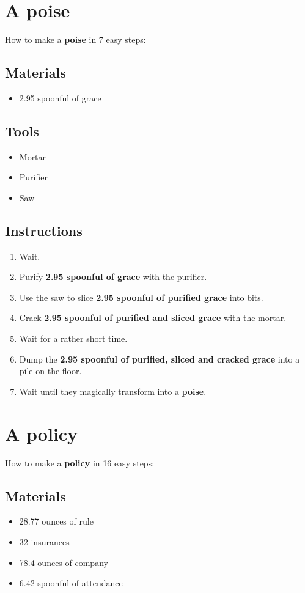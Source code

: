 \documentclass{article}
\begin{document}
\section{A poise}How to make a \textbf{poise} in 7 easy steps:

\subsection{Materials}\begin{itemize}
\item 
2.95 spoonful of grace
\end{itemize}
\subsection{Tools}\begin{itemize}
\item 
Mortar
\item 
Purifier
\item 
Saw
\end{itemize}
\subsection{Instructions}\begin{enumerate}
\item 
Wait.
\item 
Purify \textbf{2.95 spoonful of grace} with the purifier.
\item 
Use the saw to slice \textbf{2.95 spoonful of purified grace} into bits.
\item 
Crack \textbf{2.95 spoonful of purified and sliced grace} with the mortar.
\item 
Wait for a rather short time.
\item 
Dump the \textbf{2.95 spoonful of purified, sliced and cracked grace} into a pile on the floor.
\item 
Wait until they magically transform into a \textbf{poise}.
\end{enumerate}
\newpage
\section{A policy}How to make a \textbf{policy} in 16 easy steps:

\subsection{Materials}\begin{itemize}
\item 
28.77 ounces of rule
\item 
32 insurances
\item 
78.4 ounces of company
\item 
6.42 spoonful of attendance
\end{itemize}
\end{document}
